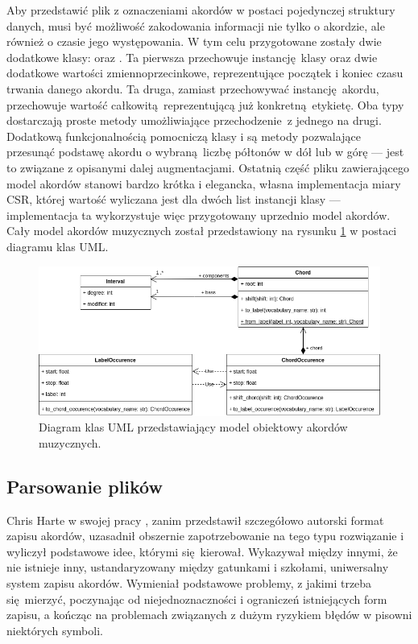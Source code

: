 Aby przedstawić plik z oznaczeniami akordów w postaci pojedynczej struktury danych, musi być możliwość zakodowania informacji nie tylko o akordzie, ale również o czasie jego występowania. W tym celu przygotowane zostały dwie dodatkowe klasy:  oraz . Ta pierwsza przechowuje instancję klasy  oraz dwie dodatkowe wartości zmiennoprzecinkowe, reprezentujące początek i koniec czasu trwania danego akordu. Ta druga, zamiast przechowywać instancję akordu, przechowuje wartość całkowitą reprezentującą już konkretną etykietę. Oba typy dostarczają proste metody umożliwiające przechodzenie z jednego na drugi. Dodatkową funkcjonalnością pomocniczą klasy  i  są metody pozwalające przesunąć podstawę akordu o wybraną liczbę półtonów w dół lub w górę --- jest to związane z opisanymi dalej augmentacjami. Ostatnią część pliku zawierającego model akordów stanowi bardzo krótka i elegancka, własna implementacja miary CSR, której wartość wyliczana jest dla dwóch list instancji klasy  --- implementacja ta wykorzystuje więc przygotowany uprzednio model akordów.  Cały model akordów muzycznych został przedstawiony na rysunku \ref{fig:chord_model} w postaci diagramu klas UML.

\begin{figure}
    \centering
    \includegraphics[width=1.0\textwidth]{./images/chord_model.png}
    \caption{Diagram klas UML przedstawiający model obiektowy akordów muzycznych.}
    \label{fig:chord_model}
\end{figure}

\subsection{Parsowanie plików }

Chris Harte w swojej pracy \cite{harte_towards_nodate}, zanim przedstawił szczegółowo autorski format zapisu akordów, uzasadnił obszernie zapotrzebowanie na tego typu rozwiązanie i wyliczył podstawowe idee, którymi się kierował. Wykazywał między innymi, że nie istnieje inny, ustandaryzowany między gatunkami i szkołami, uniwersalny system zapisu akordów.  Wymieniał podstawowe problemy, z jakimi trzeba się mierzyć, poczynając od niejednoznaczności i ograniczeń istniejących form zapisu, a kończąc na problemach związanych z dużym ryzykiem błędów w pisowni niektórych symboli.


